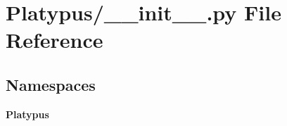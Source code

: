 \section{Platypus/\+\_\+\+\_\+init\+\_\+\+\_\+.py File Reference}
\label{_platypus_2____init_____8py}
\subsection*{Namespaces}
\begin{DoxyCompactItemize}
\item 
 {\bf Platypus}
\end{DoxyCompactItemize}
